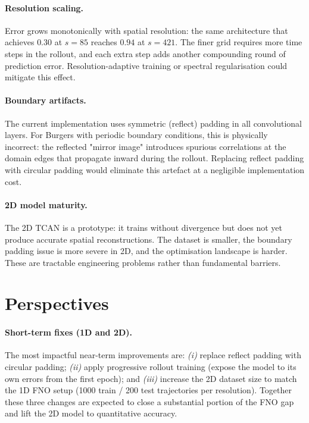 \paragraph{Resolution scaling.}
Error grows monotonically with spatial resolution: the same architecture that achieves $0.30$ at $s=85$ reaches $0.94$ at $s=421$. The finer grid requires more time steps in the rollout, and each extra step adds another compounding round of prediction error. Resolution-adaptive training or spectral regularisation could mitigate this effect.

\paragraph{Boundary artifacts.}
The current implementation uses symmetric (reflect) padding in all convolutional layers. For Burgers with periodic boundary conditions, this is physically incorrect: the reflected "mirror image" introduces spurious correlations at the domain edges that propagate inward during the rollout. Replacing reflect padding with circular padding would eliminate this artefact at a negligible implementation cost.

\paragraph{2D model maturity.}
The 2D TCAN is a prototype: it trains without divergence but does not yet produce accurate spatial reconstructions. The dataset is smaller, the boundary padding issue is more severe in 2D, and the optimisation landscape is harder. These are tractable engineering problems rather than fundamental barriers.

\section{Perspectives}
\label{sec:conclusion_perspectives}

\paragraph{Short-term fixes (1D and 2D).}
The most impactful near-term improvements are: \emph{(i)} replace reflect padding with circular padding; \emph{(ii)} apply progressive rollout training (expose the model to its own errors from the first epoch); and \emph{(iii)} increase the 2D dataset size to match the 1D FNO setup (1000 train / 200 test trajectories per resolution). Together these three changes are expected to close a substantial portion of the FNO gap and lift the 2D model to quantitative accuracy.

